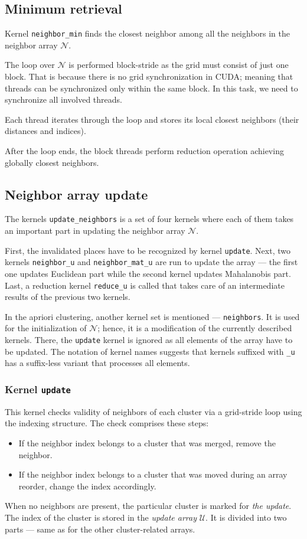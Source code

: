 \subsection{Minimum retrieval}

Kernel \texttt{neighbor\_min} finds the closest neighbor among all the neighbors in the neighbor array $\mathcal{N}$.

The loop over $\mathcal{N}$ is performed block-stride as the grid must consist of just one block. That is because there is no grid synchronization in CUDA; meaning that threads can be synchronized only within the same block. In this task, we need to synchronize all involved threads.

Each thread iterates through the loop and stores its local closest neighbors (their distances and indices).

After the loop ends, the block threads perform reduction operation achieving globally closest neighbors.

\subsection{Neighbor array update}


The kernels \texttt{update\_neighbors} is a set of four kernels where each of them takes an important part in updating the neighbor array $\mathcal{N}$.

First, the invalidated places have to be recognized by kernel \texttt{update}. Next, two kernels \texttt{neighbor\_u} and \texttt{neighbor\_mat\_u} are run to update the array --- the first one updates Euclidean part while the second kernel updates Mahalanobis part. Last, a reduction kernel \texttt{reduce\_u} is called that takes care of an intermediate results of the previous two kernels.

In the apriori clustering, another kernel set is mentioned ---  \texttt{neighbors}. It is used for the initialization of $\mathcal{N}$; hence, it is a modification of the currently described kernels. There, the \texttt{update} kernel is ignored as all elements of the array have to be updated. The notation of kernel names suggests that kernels suffixed with \texttt{\_u} has a suffix-less variant that processes all elements.

\subsubsection{Kernel \texttt{update}}
This kernel checks validity of neighbors of each cluster via a grid-stride loop using the indexing structure. The check comprises these steps:
\begin{itemize}
	\item If the neighbor index belongs to a cluster that was merged, remove the neighbor.
	\item If the neighbor index belongs to a cluster that was moved during an array reorder, change the index accordingly.
\end{itemize} 
When no neighbors are present, the particular cluster is marked for \emph{the update}. The index of the cluster is stored in the \emph{update array} $\mathcal{U}$. It is divided into two parts --- same as for the other cluster-related arrays. 

